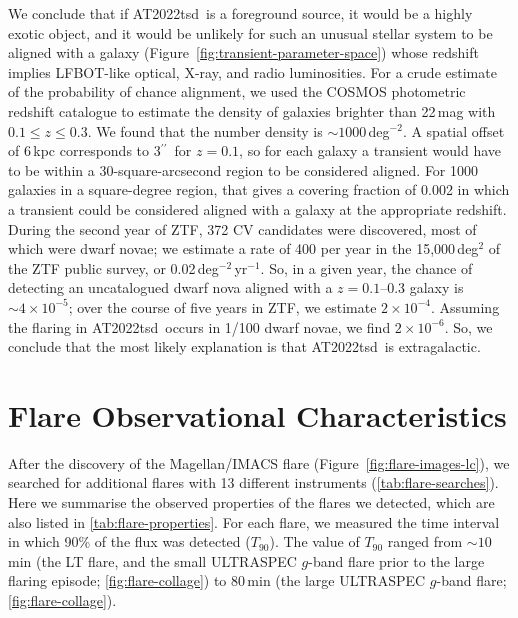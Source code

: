 \documentclass{nature_plusfigure}
\newcommand{\at}{AT2022tsd}
\newcommand{\arcsec}{$^{\prime\prime}$}
\begin{document}
\begin{methods}
We conclude that if \at\ is a foreground source, it would be a highly exotic object, and it would be unlikely for such an unusual stellar system to be aligned with a galaxy (Figure~\ref{fig:transient-parameter-space}) whose redshift implies LFBOT-like optical, X-ray, and radio luminosities.
For a crude estimate of the probability of chance alignment, we used the COSMOS photometric redshift catalogue\cite{Ilbert2008} to estimate the density of galaxies brighter than 22\,mag with $0.1 \leq z \leq 0.3$. We found that the number density is $\sim 1000$\,deg$^{-2}$.
A spatial offset of 6\,kpc corresponds to 3\arcsec\ for $z=0.1$, so for each galaxy a transient would have to be within a 30-square-arcsecond region to be considered aligned. For 1000 galaxies in a square-degree region, that gives a covering fraction of 0.002 in which a transient could be considered aligned with a galaxy at the appropriate redshift.
During the second year of ZTF, 372 CV candidates were discovered\cite{Szkody2021}, most of which were dwarf novae; we estimate a rate of 400 per year in the 15,000\,deg$^{2}$ of the ZTF public survey, or 0.02\,deg$^{-2}$\,yr$^{-1}$. So, in a given year, the chance of detecting an uncatalogued dwarf nova aligned with a $z=0.1$--0.3 galaxy is $\sim 4\times10^{-5}$; over the course of five years in ZTF, we estimate $2\times10^{-4}$. Assuming the flaring in \at\ occurs in 1/100 dwarf novae, we find $2\times10^{-6}$.
So, we conclude that the most likely explanation is that \at\ is extragalactic.

\section{Flare Observational Characteristics}
\label{sec:flare-characteristics}

After the discovery of the Magellan/IMACS flare (Figure~\ref{fig:flare-images-lc}), we searched for additional flares with 13 different instruments (\ref{tab:flare-searches}). Here we summarise the observed properties of the flares we detected, which are also listed in \ref{tab:flare-properties}. For each flare, we measured the time interval in which 90\% of the flux was detected ($T_{90}$). The value of $T_{90}$ ranged from $\sim10$\,min (the LT flare, and the small ULTRASPEC $g$-band flare prior to the large flaring episode; \ref{fig:flare-collage}) to 80\,min (the large ULTRASPEC $g$-band flare; \ref{fig:flare-collage}). 


\end{methods}
\end{document}

